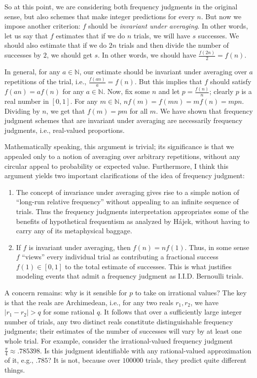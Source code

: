\documentclass[letterpaper,12pt]{article}
\newcommand{\hajek}{H\'ajek}
\begin{document}
So at this point, we are considering both frequency judgments in the original sense, but also schemes that make integer predictions for every $n$. But now we impose another criterion: $f$ should be \emph{invariant under averaging}. In other words, let us say that $f$ estimates that if we do $n$ trials, we will have $s$ successes. We should also estimate that if we do $2n$ trials and then divide the number of successes by $2$, we should get $s$. In other words, we should have $\frac{f(2n)}{2} = f(n)$.

In general, for any $a \in \mathbb{N}$, our estimate should be invariant under averaging over $a$ repetitions of the trial, i.e., $\frac{f(an)}{a} = f(n)$. But this implies that $f$ should satisfy $f(an) = af(n)$ for any $a \in \mathbb{N}$. Now, fix some $n$ and let $p = \frac{f(n)}{n}$; clearly $p$ is a real number in $[0, 1]$. For any $m \in \mathbb{N}$, $nf(m) = f(mn) = mf(n) = mpn$. Dividing by $n$, we get that $f(m) = pm$ for all $m$. We have shown that frequency judgment schemes that are invariant under averaging are necessarily frequency judgments, i.e., real-valued proportions.

Mathematically speaking, this argument is trivial; its significance is that we appealed only to a notion of averaging over arbitrary repetitions, without any circular appeal to probability or expected value. Furthermore, I think this argument yields two important clarifications of the idea of frequency judgment:

\begin{enumerate}
\item
The concept of invariance under averaging gives rise to a simple notion of ``long-run relative frequency'' without appealing to an infinite sequence of trials. Thus the frequency judgments interpretation appropriates some of the benefits of hypothetical frequentism as analyzed by \hajek, without having to carry any of its metaphysical baggage.
\item
If $f$ is invariant under averaging, then $f(n) = nf(1)$. Thus, in some sense $f$ ``views'' every individual trial as contributing a fractional success $f(1) \in [0, 1]$ to the total estimate of successes. This is what justifies modeling events that admit a frequency judgment as I.I.D. Bernoulli trials.
\end{enumerate}

A concern remains: why is it sensible for $p$ to take on irrational values? The key is that the reals are Archimedean, i.e., for any two reals $r_1, r_2$, we have $|r_1 - r_2| > q$ for some rational $q$. It follows that over a sufficiently large integer number of trials, any two distinct reals constitute distinguishable frequency judgments; their estimates of the number of successes will vary by at least one whole trial. For example, consider the irrational-valued frequency judgment $\frac{\pi}{4} \approx .785398$. Is this judgment identifiable with any rational-valued approximation of it, e.g., $.785$? It is not, because over $100000$ trials, they predict quite different things.
\end{document}
